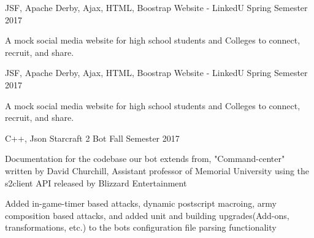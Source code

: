 


\begin{cventries}



\cventry
{JSF, Apache Derby, Ajax, HTML, Boostrap} %
{Website - LinkedU} %
{} %
{Spring Semester 2017} %
{ %
\begin{cvitems}
\item {A mock social media website for high school students and Colleges to connect, recruit, and share.}
\end{cvitems}
}


\cventry
{JSF, Apache Derby, Ajax, HTML, Boostrap} %
{Website - LinkedU} %
{} %
{Spring Semester 2017} %
{ %
\begin{cvitems}
\item {A mock social media website for high school students and Colleges to connect, recruit, and share.}
\end{cvitems}
}


\cventry
{ C++, Json} %
{Starcraft 2 Bot} %
{} %
{Fall Semester 2017} %
{ %
\begin{cvitems}
\item { Documentation for the codebase our bot extends from, "Command-center" written by David Churchill, Assistant professor of Memorial University using the s2client API released by Blizzard Entertainment}
\item {Added in-game-timer based attacks, dynamic postscript macroing, army composition  based attacks, and added unit and building upgrades(Add-ons, transformations, etc.) to the bots configuration file parsing functionality}
\end{cvitems}
}



\end{cventries}